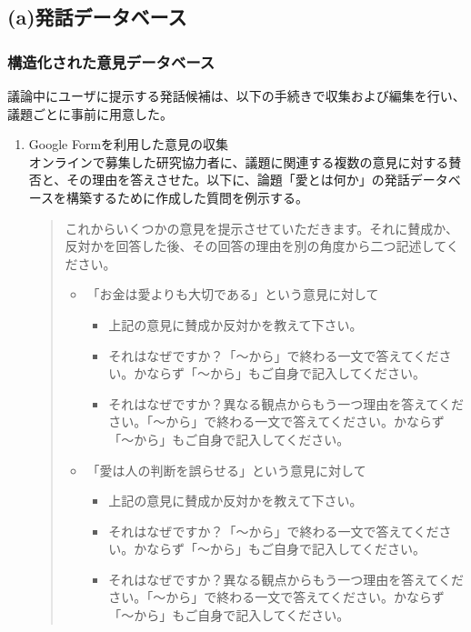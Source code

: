 \documentclass[11pt, a4paper]{jreport} %
\begin{document}
\subsection*{(a)発話データベース}
\subsubsection*{構造化された意見データベース}
議論中にユーザに提示する発話候補は、以下の手続きで収集および編集を行い、議題ごとに事前に用意した。
\begin{enumerate}
\item Google Formを利用した意見の収集\\
オンラインで募集した研究協力者に、議題に関連する複数の意見に対する賛否と、その理由を答えさせた。以下に、論題「愛とは何か」の発話データベースを構築するために作成した質問を例示する。
\begin{quote}
これからいくつかの意見を提示させていただきます。それに賛成か、反対かを回答した後、その回答の理由を別の角度から二つ記述してください。
\begin{itemize}
\item 「お金は愛よりも大切である」という意見に対して
\begin{itemize}
\item 上記の意見に賛成か反対かを教えて下さい。
\item それはなぜですか？「〜から」で終わる一文で答えてください。かならず「〜から」もご自身で記入してください。
\item それはなぜですか？異なる観点からもう一つ理由を答えてください。「〜から」で終わる一文で答えてください。かならず「〜から」もご自身で記入してください。
\end{itemize}

\item 「愛は人の判断を誤らせる」という意見に対して
\begin{itemize}
\item 上記の意見に賛成か反対かを教えて下さい。
\item それはなぜですか？「〜から」で終わる一文で答えてください。かならず「〜から」もご自身で記入してください。
\item それはなぜですか？異なる観点からもう一つ理由を答えてください。「〜から」で終わる一文で答えてください。かならず「〜から」もご自身で記入してください。
\end{itemize}
\end{itemize}
\end{quote}


\end{enumerate}
\end{document}
